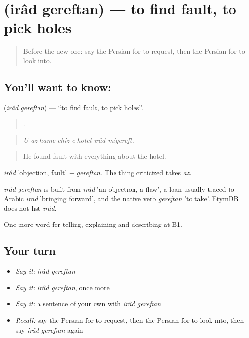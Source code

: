 \section[\texorpdfstring{\fa{ایراد} \fa{گرفتن} (irâd gereftan)}{ایراد گرفتن (irâd gereftan)}]{  (irâd gereftan) — to find fault, to pick holes}

\label{lesson:FA-C441-irad-gereftan}



\begin{quote}
Before the new one: say the Persian for to request, then the Persian for to look into.
\end{quote}

\subsection*{You'll want to know:  }
\textbf{ } (\emph{irâd gereftan}) — \textquotedblleft{}to find fault, to pick holes\textquotedblright{}.

\begin{quote}
      .
\end{quote}

\begin{quote}
\emph{U az hame chiz-e hotel irâd migereft.}
\end{quote}

\begin{quote}
He found fault with everything about the hotel.
\end{quote}

\emph{irâd} 'objection, fault' + \emph{gereftan}. The thing criticized takes \emph{az}.

\begin{cousinweb}
\emph{irâd gereftan} is built from \emph{irâd} 'an objection, a flaw', a loan usually traced to Arabic \emph{īrād} 'bringing forward', and the native verb \emph{gereftan} 'to take'. EtymDB does not list \emph{irâd}.
\end{cousinweb}

\begin{grammarlens}[title={What you've built}]
One more word for telling, explaining and describing at B1.
\end{grammarlens}

\subsection*{Your turn}
\begin{itemize}
\raggedright
  \item \emph{Say it:} \emph{irâd gereftan}
  \item \emph{Say it:} \emph{irâd gereftan}, once more
  \item \emph{Say it:} a sentence of your own with \emph{irâd gereftan}
  \item \emph{Recall:} say the Persian for to request, then the Persian for to look into, then say \emph{irâd gereftan} again
\end{itemize}


